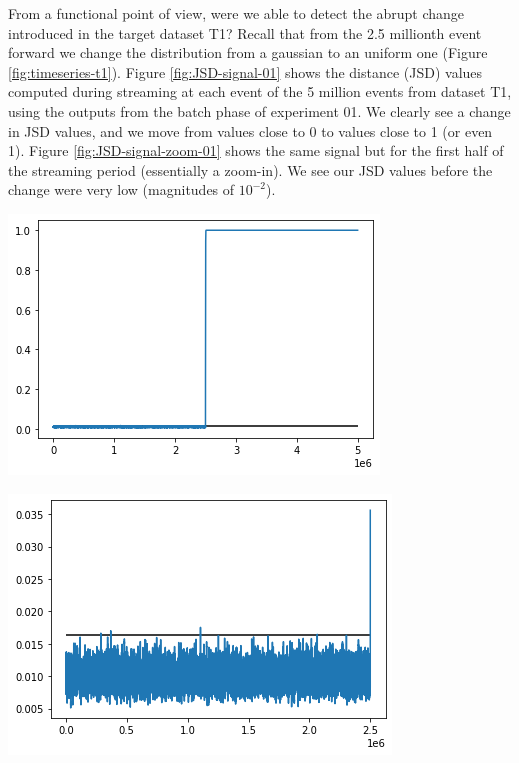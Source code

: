 From a functional point of view, were we able to detect the abrupt change introduced in the target dataset T1? Recall that from the 2.5 millionth event forward we change the distribution from a gaussian to an uniform one (Figure \ref{fig:timeseries-t1}). Figure \ref{fig:JSD-signal-01} shows the distance (JSD) values computed during streaming at each event of the 5 million events from dataset T1, using the outputs from the batch phase of experiment 01. We clearly see a change in JSD values, and we move from values close to 0 to values close to 1 (or even 1). Figure \ref{fig:JSD-signal-zoom-01} shows the same signal but for the first half of the streaming period (essentially a zoom-in). We see our JSD values before the change were very low (magnitudes of $10^{-2}$).
\begin{center}
\begin{minipage}{.5\textwidth}
  \centering
  \includegraphics[width=1\linewidth]{figures/stream-analysis-viz-625.png}
  \label{fig:JSD-signal-01}
\end{minipage}%
\begin{minipage}{.5\textwidth}
  \centering
  \includegraphics[width=1\linewidth]{figures/stream-analysis-viz-zoom-625.png}
  \label{fig:JSD-signal-zoom-01}
\end{minipage}
\end{center}
